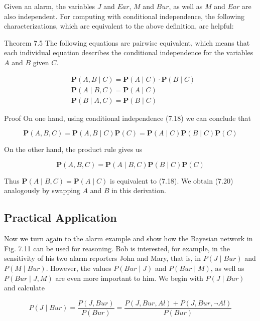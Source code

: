\documentclass[10pt]{book}
\begin{document}
Given an alarm, the variables $J$ and $Ear$, $M$ and $Bur$, as well as $M$ and $Ear$ are also independent. For computing with conditional independence, the following characterizations, which are equivalent to the above definition, are helpful:

Theorem 7.5 The following equations are pairwise equivalent, which means that each individual equation describes the conditional independence for the variables $A$ and $B$ given $C$.

\begin{align*}
& \boldsymbol{P}(A, B \mid C)=\boldsymbol{P}(A \mid C) \cdot \boldsymbol{P}(B \mid C)  \tag{7.18}\\
& \boldsymbol{P}(A \mid B, C)=\boldsymbol{P}(A \mid C)  \tag{7.19}\\
& \boldsymbol{P}(B \mid A, C)=\boldsymbol{P}(B \mid C) \tag{7.20}
\end{align*}

Proof On one hand, using conditional independence (7.18) we can conclude that

$$
\boldsymbol{P}(A, B, C)=\boldsymbol{P}(A, B \mid C) \boldsymbol{P}(C)=\boldsymbol{P}(A \mid C) \boldsymbol{P}(B \mid C) \boldsymbol{P}(C)
$$

On the other hand, the product rule gives us

$$
\boldsymbol{P}(A, B, C)=\boldsymbol{P}(A \mid B, C) \boldsymbol{P}(B \mid C) \boldsymbol{P}(C)
$$

Thus $\boldsymbol{P}(A \mid B, C)=\boldsymbol{P}(A \mid C)$ is equivalent to (7.18). We obtain (7.20) analogously by swapping $A$ and $B$ in this derivation.

\subsection{Practical Application}
Now we turn again to the alarm example and show how the Bayesian network in Fig. 7.11 can be used for reasoning. Bob is interested, for example, in the sensitivity of his two alarm reporters John and Mary, that is, in $P(J \mid Bur)$ and $P(M \mid Bur)$. However, the values $P(Bur \mid J)$ and $P(Bur \mid M)$, as well as $P(Bur \mid J, M)$ are even more important to him. We begin with $P(J \mid Bur)$ and calculate

\begin{equation*}
P(J \mid Bur)=\frac{P(J, Bur)}{P(Bur)}=\frac{P(J, Bur, Al)+P(J, Bur, \neg Al)}{P(Bur)} \tag{7.21}
\end{equation*}
\end{document}
